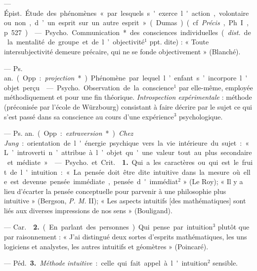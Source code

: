 \begin{itemize}[leftmargin=1cm, label=, itemsep=1pt]
 — \si{Épist.} Étude des phénomènes « par lesquels
s'exerce l'action, volontaire ou non, d’un esprit sur un autre
esprit » (Dumas) (cf. {\it Précis}, Ph. I, p. 527).

 — \si{Psycho.} Communication* des consciences
individuelles ({\it dist.} de la mentalité de groupe et de l’objectivité$^1$
ppt. dite) : « Toute intersubjectivité demeure précaire, qui ne se fonde
objectivement » (Blanché).

 — \si{Ps. an.} (Opp. : {\it projection}*) Phénomène
par lequel l’enfant s’incorpore l'objet perçu.

 — \si{Psycho.} Observation de la conscience$^1$ par
elle-même, employée méthodiquement et pour une fin théorique.
{\it Introspection expérimentale} : méthode (préconisée par l’école de
Würzbourg) consistant à faire décrire par le sujet ce qui s’est passé dans sa
conscience au cours d'une expérience$^3$ psychologique.

 — \si{Ps. an.} (Opp. : {\it extraversion}*).
{\it Chez Jung} : orientation de l'énergie psychique vers la vie intérieure
du sujet : « L’introverti n’attribue à l’objet qu'une valeur tout au plus
secondaire et médiate. »

 — \si{Psycho.} et \si{Crit.}  {\bf 1.} Qui a les caractères ou
qui est le fruit de l'intuition : « La pensée doit être dite intuitive dans
la mesure où elle est devenue pensée immédiate, pensée d'immédiat$^2$ » (Le
Roy); « Il y a lieu d’écarter la pensée conceptuelle pour parvenir à une
philosophie plus intuitive » (Bergson, {\it P. M.} II); « Les aspects
intuitifs
[des mathématiques] sont liés aux diverses impressions de nos
sens » (Bouligand).

— \si{Car.}  {\bf 2.} (En parlant des personnes). Qui pense
par intuition$^3$ plutôt que par raisonnement : « J'ai distingué deux sortes
d’esprits mathématiques, les uns logiciens et analystes, les autres intuitifs
et géomètres » (Poincaré).

— \si{Péd.} {\bf 3.} {\it Méthode intuitive} : celle qui fait appel à
l'intuition$^2$ sensible.


\end{itemize}
